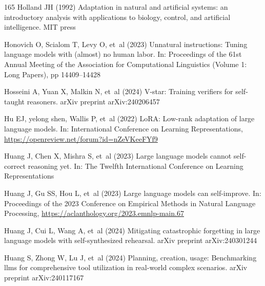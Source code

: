 \documentclass[sn-basic, Numbered]{sn-jnl}%
\theoremstyle{thmstyleone}%
\theoremstyle{thmstyletwo}%
\theoremstyle{thmstylethree}%
\begin{document}
\begin{thebibliography}{165}
Holland JH (1992) Adaptation in natural and artificial systems: an introductory analysis with applications to biology, control, and artificial intelligence. MIT press

Honovich O, Scialom T, Levy O, et~al (2023) Unnatural instructions: Tuning language models with (almost) no human labor. In: Proceedings of the 61st Annual Meeting of the Association for Computational Linguistics (Volume 1: Long Papers), pp 14409--14428

Hosseini A, Yuan X, Malkin N, et~al (2024) V-star: Training verifiers for self-taught reasoners. arXiv preprint arXiv:240206457

Hu EJ, yelong shen, Wallis P, et~al (2022) Lo{RA}: Low-rank adaptation of large language models. In: International Conference on Learning Representations, \urlprefix\url{https://openreview.net/forum?id=nZeVKeeFYf9}

Huang J, Chen X, Mishra S, et~al (2023{}) Large language models cannot self-correct reasoning yet. In: The Twelfth International Conference on Learning Representations

Huang J, Gu SS, Hou L, et~al (2023{}) Large language models can self-improve. In: Proceedings of the 2023 Conference on Empirical Methods in Natural Language Processing, \urlprefix\url{https://aclanthology.org/2023.emnlp-main.67}

Huang J, Cui L, Wang A, et~al (2024{}) Mitigating catastrophic forgetting in large language models with self-synthesized rehearsal. arXiv preprint arXiv:240301244

Huang S, Zhong W, Lu J, et~al (2024{}) Planning, creation, usage: Benchmarking llms for comprehensive tool utilization in real-world complex scenarios. arXiv preprint arXiv:240117167


\end{thebibliography}
\end{document}
